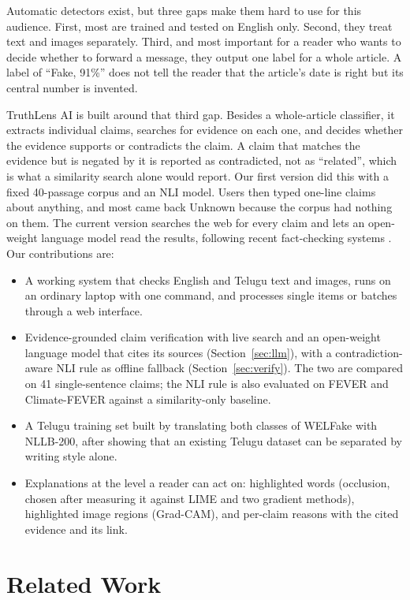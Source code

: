 \documentclass[conference]{IEEEtran}
\begin{document}
Automatic detectors exist, but three gaps make them hard to use for this audience. First, most are trained and tested on English only. Second, they treat text and images separately. Third, and most important for a reader who wants to decide whether to forward a message, they output one label for a whole article. A label of ``Fake, 91\%'' does not tell the reader that the article's date is right but its central number is invented.

TruthLens AI is built around that third gap. Besides a whole-article classifier, it extracts individual claims, searches for evidence on each one, and decides whether the evidence supports or contradicts the claim. A claim that matches the evidence but is negated by it is reported as contradicted, not as ``related'', which is what a similarity search alone would report. Our first version did this with a fixed 40-passage corpus and an NLI model. Users then typed one-line claims about anything, and most came back Unknown because the corpus had nothing on them. The current version searches the web for every claim and lets an open-weight language model read the results, following recent fact-checking systems \cite{xie2025fire,putta2025claimcheck}. Our contributions are:

\begin{itemize}
\item A working system that checks English and Telugu text and images, runs on an ordinary laptop with one command, and processes single items or batches through a web interface.
\item Evidence-grounded claim verification with live search and an open-weight language model that cites its sources (Section~\ref{sec:llm}), with a contradiction-aware NLI rule as offline fallback (Section~\ref{sec:verify}). The two are compared on 41 single-sentence claims; the NLI rule is also evaluated on FEVER and Climate-FEVER against a similarity-only baseline.
\item A Telugu training set built by translating both classes of WELFake with NLLB-200, after showing that an existing Telugu dataset can be separated by writing style alone.
\item Explanations at the level a reader can act on: highlighted words (occlusion, chosen after measuring it against LIME and two gradient methods), highlighted image regions (Grad-CAM), and per-claim reasons with the cited evidence and its link.
\end{itemize}

\section{Related Work}
\end{document}
